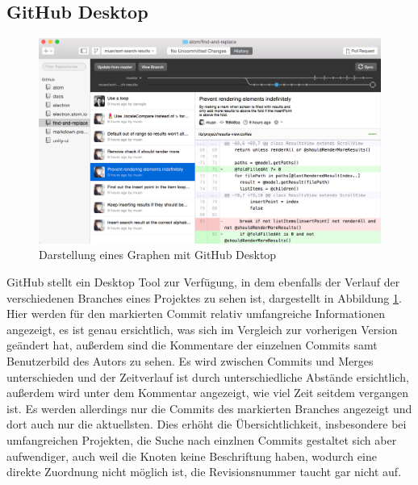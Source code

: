 \documentclass[nocolor]{tudbook}
\begin{document}
\subsection{GitHub Desktop}
\begin{figure}[htb] 
  \centering
     \includegraphics[width=\textwidth]{GitHubDesktop.png}
  \caption[Darstellung eines Graphen mit GitHub Dekstop, entnommen von \GitHubDesktop, abgerufen am 24.11.2015]{Darstellung eines Graphen mit GitHub Desktop}
  \label{fig:GitHubDesktop}
\end{figure}
GitHub stellt ein Desktop Tool zur Verfügung, in dem ebenfalls der Verlauf der verschiedenen Branches eines Projektes zu sehen ist, dargestellt in Abbildung \ref{fig:GitHubDesktop}. Hier werden für den markierten Commit relativ umfangreiche Informationen angezeigt, es ist genau ersichtlich, was sich im Vergleich zur vorherigen Version geändert hat, außerdem sind die Kommentare der einzelnen Commits samt Benutzerbild des Autors zu sehen. Es wird zwischen Commits und Merges unterschieden und der Zeitverlauf ist durch unterschiedliche Abstände ersichtlich, außerdem wird unter dem Kommentar angezeigt, wie viel Zeit seitdem vergangen ist. Es werden allerdings nur die Commits des markierten Branches angezeigt und dort auch nur die aktuellsten. Dies erhöht die Übersichtlichkeit, insbesondere bei umfangreichen Projekten, die Suche nach einzlnen Commits gestaltet sich aber aufwendiger, auch weil die Knoten keine Beschriftung haben, wodurch eine direkte Zuordnung nicht möglich ist, die Revisionsnummer taucht gar nicht auf.
\end{document}

